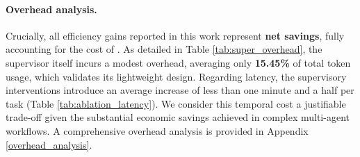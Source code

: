 \paragraph{Overhead analysis.}
Crucially, all efficiency gains reported in this work represent \textbf{net savings}, fully accounting for the cost of \method. As detailed in Table \ref{tab:super_overhead}, the supervisor itself incurs a modest overhead, averaging only \textbf{15.45\%} of total token usage, which validates its lightweight design. Regarding latency, the supervisory interventions introduce an average increase of less than one minute and a half per task (Table \ref{tab:ablation_latency}). We consider this temporal cost a justifiable trade-off given the substantial economic savings achieved in complex multi-agent workflows. A comprehensive overhead analysis is provided in Appendix \ref{overhead_analysis}.

